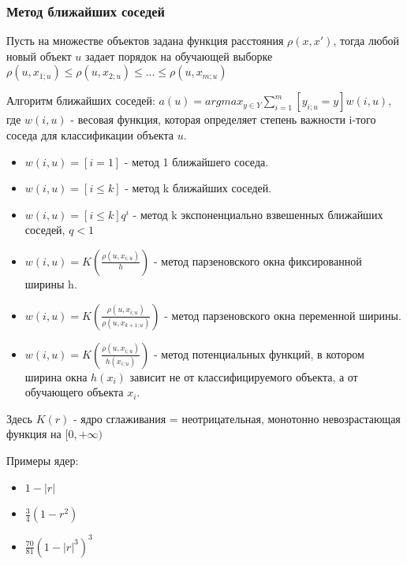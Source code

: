 \documentclass{article}
\begin{document}
\subsubsection{Метод ближайших соседей}


Пусть на множестве объектов задана функция расстояния $\rho(x, x')$, тогда
любой новый объект $u$ задает порядок на обучающей выборке
$\rho(u, x_{1; u}) \leq \rho(u, x_{2; u}) \leq ... \leq \rho(u, x_{m; u})$

Алгоритм ближайших соседей: $a(u) = argmax_{y \in Y} \sum\limits_{i=1}^m
[y_{i;u} = y] w(i, u)$, где $w(i, u)$ - весовая функция, которая определяет
степень важности i-того соседа для классификации объекта $u$.

\begin{itemize}
	\item $w(i, u) = [i = 1]$ - метод 1 ближайшего соседа.
	\item $w(i, u) = [i \leq k]$ - метод k ближайших соседей.
	\item $w(i, u) = [i \leq k]q^i$ - метод k экспоненциально взвешенных ближайших соседей, $q < 1$
	\item $w(i, u) = K\left(\frac{\rho(u, x_{i; u})}{h}\right)$ - метод парзеновского окна фиксированной ширины h.
	\item $w(i, u) = K\left(\frac{\rho(u, x_{i; u})}{\rho(u, x_{k+1; u})}\right)$ -
	метод парзеновского окна переменной ширины.
	\item $w(i, u) = K\left(\frac{\rho(u, x_{i; u})}{h(x_{i; u})}\right)$ -
	метод потенциальных функций, в котором ширина окна $h(x_i)$ зависит не от
	классифицируемого объекта, а от обучающего объекта $x_i$.
\end{itemize}

Здесь $K(r)$ - ядро сглаживания = неотрицательная, монотонно невозрастающая функция на $[0, +\infty)$

Примеры ядер:
\begin{itemize}
	\item $1 - |r|$
	\item $\frac{3}{4}(1 - r^2)$
	\item $\frac{70}{81} (1 - |r|^3)^3$
\end{itemize}
\end{document}
